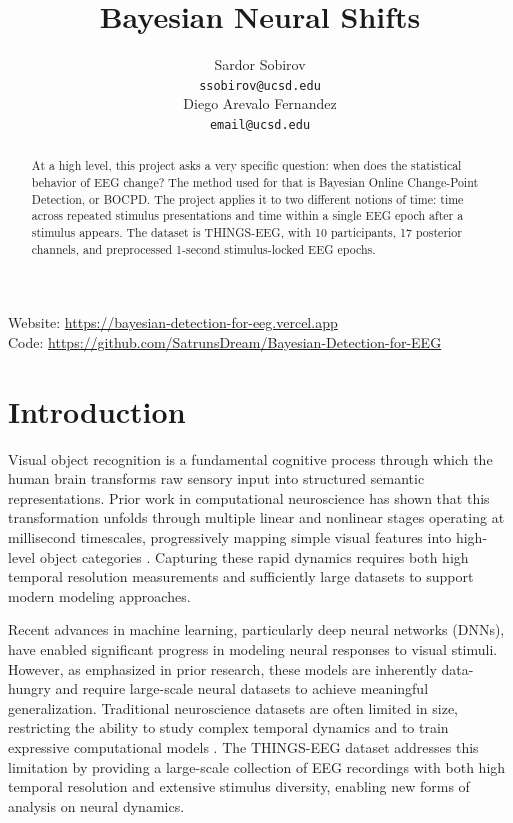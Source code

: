 \documentclass[11pt,letterpaper]{article}
\title{Bayesian Neural Shifts}
\author{Sardor Sobirov \\
  {\tt ssobirov@ucsd.edu} \\\And
  Diego Arevalo Fernandez \\
  {\tt email@ucsd.edu} \\}
\begin{document}
\maketitle



\begin{abstract}
    {
   At a high level, this project asks a very specific question: when does the statistical behavior of EEG change? The method used for that is Bayesian Online Change-Point Detection, or BOCPD. The project applies it to two different notions of time: time across repeated stimulus presentations and time within a single EEG epoch after a stimulus appears. The dataset is THINGS-EEG, with 10 participants, 17 posterior channels, and preprocessed 1-second stimulus-locked EEG epochs.
    }
\end{abstract}

\begin{center}
Website: \url{https://bayesian-detection-for-eeg.vercel.app} \\
Code: \url{https://github.com/SatrunsDream/Bayesian-Detection-for-EEG}
\end{center}

\maketoc
\clearpage


\section{Introduction}

Visual object recognition is a fundamental cognitive process through which the human brain transforms raw sensory input into structured semantic representations. Prior work in computational neuroscience has shown that this transformation unfolds through multiple linear and nonlinear stages operating at millisecond timescales, progressively mapping simple visual features into high-level object categories \citep{adams2007bocpd}. Capturing these rapid dynamics requires both high temporal resolution measurements and sufficiently large datasets to support modern modeling approaches.

Recent advances in machine learning, particularly deep neural networks (DNNs), have enabled significant progress in modeling neural responses to visual stimuli. However, as emphasized in prior research, these models are inherently data-hungry and require large-scale neural datasets to achieve meaningful generalization. Traditional neuroscience datasets are often limited in size, restricting the ability to study complex temporal dynamics and to train expressive computational models \citep{adams2007bocpd}. The THINGS-EEG dataset addresses this limitation by providing a large-scale collection of EEG recordings with both high temporal resolution and extensive stimulus diversity, enabling new forms of analysis on neural dynamics.
\end{document}
